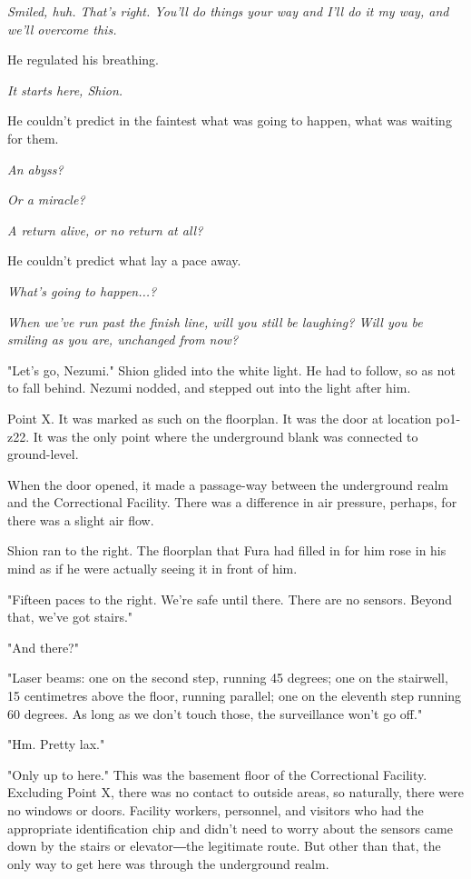 \emph{Smiled, huh. That's right. You'll do things your way and I'll do it my
	way, and we'll overcome this.}

He regulated his breathing.

\emph{It starts here, Shion.}

He couldn't predict in the faintest what was going to happen, what was
waiting for them.

\emph{An abyss?}

\emph{Or a miracle?}

\emph{A return alive, or no return at all?}

He couldn't predict what lay a pace away.

\emph{What's going to happen...?}

\emph{When we've run past the finish line, will you still be laughing? Will
	you be smiling as you are, unchanged from now?}

"Let's go, Nezumi." Shion glided into the white light. He had to follow,
so as not to fall behind. Nezumi nodded, and stepped out into the light
after him.

Point X. It was marked as such on the floorplan. It was the door at
location po1-z22. It was the only point where the underground blank was
connected to ground-level.

When the door opened, it made a passage-way between the underground
realm and the Correctional Facility. There was a difference in air
pressure, perhaps, for there was a slight air flow.

Shion ran to the right. The floorplan that Fura had filled in for him
rose in his mind as if he were actually seeing it in front of him.

"Fifteen paces to the right. We're safe until there. There are no
sensors. Beyond that, we've got stairs."

"And there?"

"Laser beams: one on the second step, running 45 degrees; one on the
stairwell, 15 centimetres above the floor, running parallel; one on the
eleventh step running 60 degrees. As long as we don't touch those, the
surveillance won't go off."

"Hm. Pretty lax."

"Only up to here." This was the basement floor of the Correctional
Facility. Excluding Point X, there was no contact to outside areas, so
naturally, there were no windows or doors. Facility workers, personnel,
and visitors who had the appropriate identification chip and didn't need
to worry about the sensors came down by the stairs or elevator―the
legitimate route. But other than that, the only way to get here was
through the underground realm.


